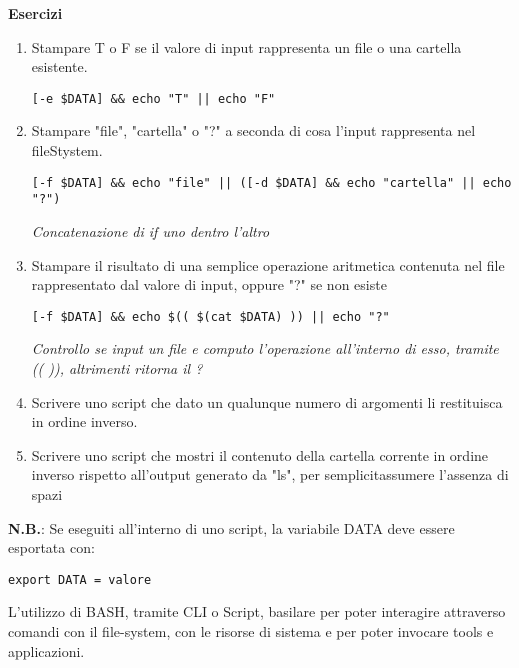 \begin{flushleft}
  \textbf{Esercizi}
  \begin{enumerate}
    \item Stampare T o F se il valore di input rappresenta un file o una cartella esistente. 
          \begin{center}
            \texttt{[-e \$DATA] \&\& echo "T" || echo "F"}
          \end{center}
    \item Stampare "file", "cartella" o "?" a seconda di cosa l'input rappresenta nel fileStystem.
          \begin{center}
            \texttt{[-f \$DATA] \&\& echo "file" || ([-d \$DATA] \&\& echo "cartella" || echo "?")}
          \end{center}
          \textit{Concatenazione di if uno dentro l'altro}
    \item Stampare il risultato di una semplice operazione aritmetica contenuta nel file 
          rappresentato dal valore di input, oppure "?" se non esiste
          \begin{center}
            \texttt{[-f \$DATA] \&\& echo \$(( \$(cat \$DATA) )) || echo "?"}
          \end{center}
          \textit{Controllo se input \ace un file e computo l'operazione all'interno di esso, tramite (( )), altrimenti 
          ritorna il ?}
    \item Scrivere uno script che dato un qualunque numero di argomenti li restituisca in ordine inverso.
    \item Scrivere uno script che mostri il contenuto della cartella corrente in ordine 
          inverso rispetto all'output generato da "ls", per semplicit\aca assumere l'assenza di spazi 
  \end{enumerate}
  \textbf{N.B.}: Se eseguiti all'interno di uno script, la variabile DATA deve essere esportata con:
  \begin{center}
    \texttt{export DATA = valore}
  \end{center}  
\end{flushleft}
L'utilizzo di BASH, tramite CLI o Script, \ace basilare per poter interagire 
attraverso comandi con il file-system, con le risorse di sistema e per poter invocare 
tools e applicazioni.
